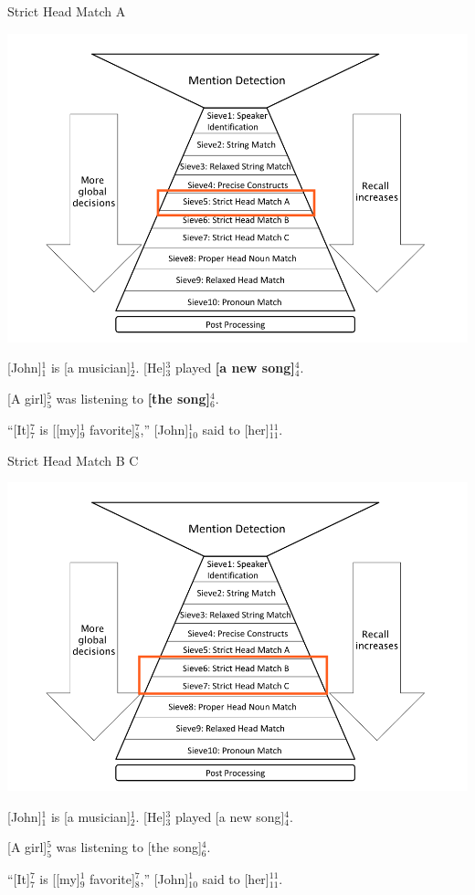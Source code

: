 \documentclass[11pt,a4paper]{beamer}
\begin{document}
\begin{frame}{Strict Head Match A}

\includegraphics[scale=0.15]{sieve5.png} 
\bigskip

[John]$^{1}_{1}$ is [a musician]$^{1}_{2}$. [He]$^{3}_{3}$ played \textbf{[a new song]}$^{4}_{4}$.

[A girl]$^{5}_{5}$ was listening to \textbf{[the song]}$^{4}_{6}$.

“[It]$^{7}_{7}$ is [[my]$^{1}_{9}$ favorite]$^{7}_{8}$,” [John]$^{1}_{10}$ said to [her]$^{11}_{11}$.

\end{frame}

\begin{frame}{Strict Head Match B C}

\includegraphics[scale=0.15]{sieve67.png} 
\bigskip

[John]$^{1}_{1}$ is [a musician]$^{1}_{2}$. [He]$^{3}_{3}$ played [a new song]$^{4}_{4}$.

[A girl]$^{5}_{5}$ was listening to [the song]$^{4}_{6}$.

“[It]$^{7}_{7}$ is [[my]$^{1}_{9}$ favorite]$^{7}_{8}$,” [John]$^{1}_{10}$ said to [her]$^{11}_{11}$.

\end{frame}
\end{document}
